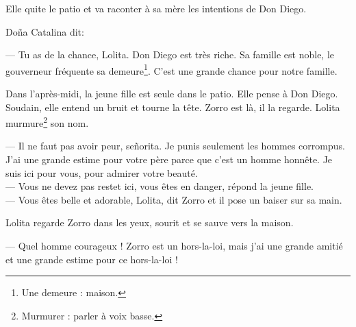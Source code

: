 Elle quite le patio et va raconter à sa mère les intentions de Don Diego.

Doña Catalina dit:

--- Tu as de la chance, Lolita. Don Diego est très riche. Sa famille est noble, le gouverneur fréquente sa
    demeure\footnote{Une demeure : maison.}. C'est une grande chance pour notre famille.

Dans l'après-midi, la jeune fille est seule dans le patio. Elle pense à Don Diego. Soudain, elle entend un bruit et
tourne la tête. Zorro est là, il la regarde. Lolita murmure\footnote{Murmurer : parler à voix basse.} son nom.

--- Il ne faut pas avoir peur, señorita. Je punis seulement les hommes corrompus. J'ai une grande estime pour votre
    père parce que c'est un homme honnête. Je suis ici pour vous, pour admirer votre beauté.\\
--- Vous ne devez pas restet ici, vous êtes en danger, répond la jeune fille.\\
--- Vous êtes belle et adorable, Lolita, dit Zorro et il pose un baiser sur sa main.

Lolita regarde Zorro dans les yeux, sourit et se sauve vers la maison.

--- Quel homme courageux ! Zorro est un hors-la-loi, mais j'ai une grande amitié et une grande estime pour ce
    hors-la-loi !
